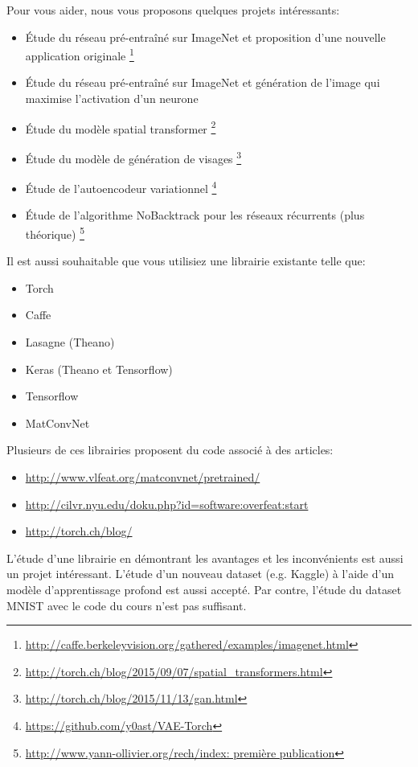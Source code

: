 \documentclass{article}
\begin{document}
Pour vous aider, nous vous proposons quelques projets intéressants:
\begin{itemize}
\item Étude du réseau pré-entraîné sur ImageNet et proposition d'une nouvelle application originale \footnote{\url{http://caffe.berkeleyvision.org/gathered/examples/imagenet.html}}
\item Étude du réseau pré-entraîné sur ImageNet et génération de l'image qui maximise l'activation d'un neurone 
\item Étude du modèle spatial transformer \footnote{\url{http://torch.ch/blog/2015/09/07/spatial_transformers.html}} 
\item Étude du modèle de génération de visages \footnote{\url{http://torch.ch/blog/2015/11/13/gan.html}} 
\item Étude de l'autoencodeur variationnel \footnote{\url{https://github.com/y0ast/VAE-Torch}} 
\item Étude de l'algorithme NoBacktrack pour les réseaux récurrents (plus théorique) \footnote{\url{http://www.yann-ollivier.org/rech/index: première publication}} 
\end{itemize}

Il est aussi souhaitable que vous utilisiez une librairie existante telle que:
\begin{itemize}
\item Torch 
\item Caffe
\item Lasagne (Theano)
\item Keras (Theano et Tensorflow)
\item Tensorflow
\item MatConvNet
\end{itemize}

Plusieurs de ces librairies proposent du code associé à des articles:
\begin{itemize}
\item \url{http://www.vlfeat.org/matconvnet/pretrained/}
\item \url{http://cilvr.nyu.edu/doku.php?id=software:overfeat:start}
\item \url{http://torch.ch/blog/}
\end{itemize}

L'étude d'une librairie en démontrant les avantages et les inconvénients est aussi un projet intéressant.
L'étude d'un nouveau dataset (e.g. Kaggle) à l'aide d'un modèle d'apprentissage profond est aussi accepté.
Par contre, l'étude du dataset MNIST avec le code du cours n'est pas suffisant.
\end{document}
